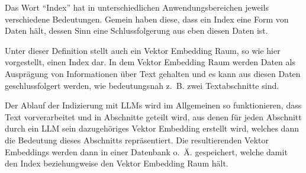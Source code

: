 \documentclass[../main.tex]{subfiles}
\begin{document}
Das Wort \enquote{Index} hat in unterschiedlichen Anwendungsbereichen jeweils verschiedene Bedeutungen.
Gemein haben diese, dass ein Index eine Form von Daten hält, dessen Sinn eine Schlussfolgerung aus eben diesen Daten ist.
\cite{Chatterjee2017Index,Lo2016What,Vickery1950THE}

Unter dieser Definition stellt auch ein Vektor Embedding Raum, so wie hier vorgestellt, einen Index dar.
In dem Vektor Embedding Raum werden Daten als Ausprägung von Informationen über Text gehalten und es kann aus diesen Daten geschlussfolgert werden, wie bedeutungsnah z. B. zwei Textabschnitte sind.

Der Ablauf der Indizierung mit \glspl{LLM} wird im Allgemeinen so funktionieren, dass Text vorverarbeitet und in Abschnitte geteilt wird, aus denen für jeden Abschnitt durch ein \gls{LLM} sein  dazugehöriges Vektor Embedding erstellt wird, welches dann die Bedeutung dieses Abschnitts repräsentiert.
Die resultierenden Vektor Embeddings werden dann in einer Datenbank o. Ä. gespeichert, welche damit den Index beziehungweise den Vektor Embedding Raum hält.
\cite{ji2022speeding}
\end{document}
